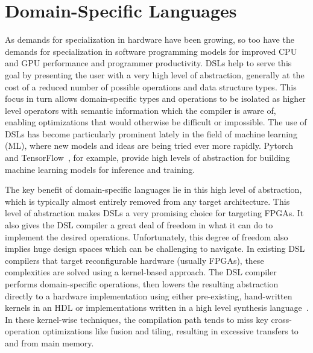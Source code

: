 \section{Domain-Specific Languages}
As demands for specialization in hardware have been growing, so too have the demands for
specialization in software programming models for improved CPU and GPU performance and programmer productivity.
DSLs help to serve this goal by presenting the user with a very high level of abstraction, generally
at the cost of a reduced number of possible operations and data structure types.
This focus in turn allows domain-specific types and operations to be isolated as
higher level operators with semantic information which the compiler is aware of,
enabling optimizations that would otherwise be difficult or impossible.
The use of DSLs has become particularly prominent lately in the field of machine learning (ML),
where new models and ideas are being tried ever more rapidly. Pytorch~\cite{pytorch} and TensorFlow~\cite{tensorflow}, for example,
provide high levels of abstraction for building machine learning models for inference and training.

The key benefit of domain-specific languages lie in this
high level of abstraction, which is typically almost entirely removed from any target
architecture. This level of abstraction makes DSLs a very promising choice for targeting FPGAs.
It also gives the DSL compiler a great deal of freedom in what it can do to implement the
desired operations. Unfortunately, this degree of freedom also implies huge design spaces
which can be challenging to navigate.
In existing DSL compilers that target reconfigurable hardware (usually FPGAs),
these complexities are solved using a kernel-based approach.
The DSL compiler performs domain-specific operations, then lowers the resulting
abstraction directly to a hardware implementation using either pre-existing, hand-written kernels in
an HDL or implementations written in a high level synthesis language~\cite{george14fpl}.
In these kernel-wise techniques, the compilation path tends to miss key cross-operation optimizations
like fusion and tiling, resulting in excessive transfers to and from main memory.

